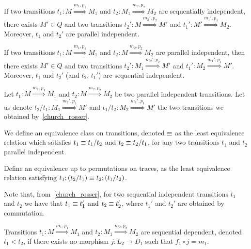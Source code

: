 \begin{lemma}
  \label{church_rosser}
  If two transitions $t_1:M\overset{m_1,p_1}{\Rightarrow} M_1$ and $t_2:M_1\overset{m_2,p_2}{\Rightarrow} M_2$ are sequentially independent, there exists $M'\in Q$ and two transitions $t_2':M\overset{m_2',p_2}{\Rightarrow} M'$ and $t_1':M'\overset{m_1',p_1}{\Rightarrow} M_2$. Moreover, $t_1$ and $t_2'$ are parallel independent.

If two transitions $t_1:M\overset{m_1,p_1}{\Rightarrow} M_1$ and $t_2:M\overset{m_2,p_2}{\Rightarrow} M_2$ are parallel independent, then there exists $M'\in Q$ and two transitions $t_2':M_1\overset{m_2',p_2}{\Rightarrow} M'$ and $t_1':M_2\overset{m_1',p_1}{\Rightarrow} M'$. Moreover, $t_1$ and $t_2'$ (and $t_2$, $t_1'$) are sequential independent.
\end{lemma}

Let $t_1:M\overset{m_1,p_1}{\Rightarrow} M_1$ and $t_2:M\overset{m_2,p_2}{\Rightarrow} M_2$ be two parallel independent transitions.  Let us denote $t_2/t_1:M_1\overset{m_2',p_2}{\Rightarrow} M'$ and $t_1/t_2:M_2\overset{m_1',p_1}{\Rightarrow} M'$ the two transitions we obtained by~\autoref{church_rosser}.

\begin{definition}
We define an equivalence class on transitions, denoted $\equiv$ as the least equivalence relation which satisfies $t_1\equiv t_1/t_2$ and $t_2\equiv t_2/t_1$, for any two transitions $t_1$ and $t_2$ parallel independent.

Define an equivalence up to permutations on traces, as the least equivalence relation satisfying $t_1;(t_2/t_1)\equiv t_2;(t_1/t_2)$.
\end{definition}

Note that, from~\autoref{church_rosser}, for two sequential independent transitions $t_1$ and $t_2$ we have that $t_1\equiv t_1'$ and $t_2\equiv t_2'$, where $t_1'$ and $t_2'$ are obtained by commutation.


\begin{definition}
  \label{def:seq_dep}
  Transitions $t_1:M\overset{m_1,p_1}{\Rightarrow} M_1$ and $t_2:M_1\overset{m_2,p_2}{\Rightarrow} M_2$ are sequential dependent, denoted $t_1 < t_2$, if there exists no morphism $j:L_2\to D_1$ such that $f_1\circ j= m_1$.
\end{definition}

